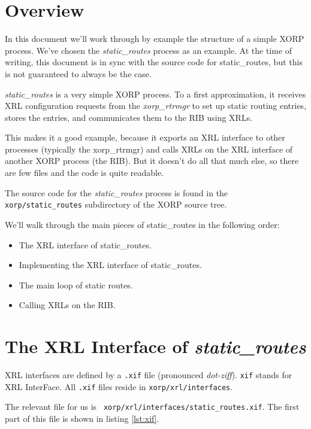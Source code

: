\documentclass[11pt]{article}
\newcommand{\stt}{\tt\small}
\newcommand{\SRI}{{\it static\_routes}\xspace}
\begin{document}
\section{Overview}

In this document we'll work through by example the structure of a
simple XORP process.  We've chosen the {\it static\_routes} process as
an example.  At the time of writing, this document is in sync with the
source code for static\_routes, but this is not guaranteed to always be
the case.

{\it static\_routes} is a very simple XORP process.  To a first
approximation, it receives XRL configuration requests from the
{\it xorp\_rtrmgr} to set up static routing entries, stores the entries, and
communicates them to the RIB using XRLs.  

This makes it a good example, because it exports an XRL interface to
other processes (typically the xorp\_rtrmgr) and calls XRLs on the XRL
interface of another XORP process (the RIB).  But it doesn't do all
that much else, so there are few files and the code is quite readable.

The source code for the \SRI process is found in the {\stt
xorp/static\_routes} subdirectory of the XORP source tree.

We'll walk through the main pieces of static\_routes in the following
order:

\begin{itemize}
\item The XRL interface of static\_routes.
\item Implementing the XRL interface of static\_routes.
\item The main loop of static routes.
\item Calling XRLs on the RIB.
\end{itemize}


\newpage
\section{The XRL Interface of {\it static\_routes}}

XRL interfaces are defined by a {\stt.xif} file (pronounced {\it dot-ziff}).
{\stt xif} stands for XRL InterFace.  All {\stt.xif} files reside in
{\stt xorp/xrl/interfaces}.

The relevant file for us is {\stt
xorp/xrl/interfaces/static\_routes.xif}. The first part of this file is
shown in listing \ref{lst:xif}.
\end{document}
